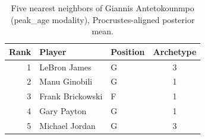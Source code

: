 \begin{table}[htbp]
  \centering\small
  \begin{tabular}{rllc}
    \toprule
    Rank & Player & Position & Archetype \\
    \midrule
    1 & LeBron James & G & 3 \\
    2 & Manu Ginobili & G & 1 \\
    3 & Frank Brickowski & F & 1 \\
    4 & Gary Payton & G & 1 \\
    5 & Michael Jordan & G & 3 \\
    \bottomrule
  \end{tabular}
  \caption{Five nearest neighbors of Giannis Antetokounmpo (peak_age modality), Procrustes-aligned posterior mean.}
  \label{tab:Giannis_Antetokounmpo_neighbors_peak_age}
\end{table}

